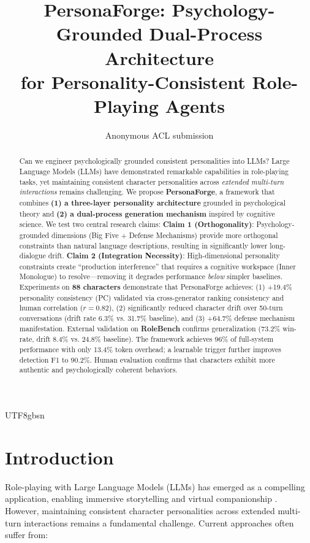 \documentclass[11pt]{article}
\title{PersonaForge: Psychology-Grounded Dual-Process Architecture \\ for Personality-Consistent Role-Playing Agents}
\author{Anonymous ACL submission}
\begin{document}
\begin{CJK*}{UTF8}{gbsn}
\maketitle

\begin{abstract}
Can we engineer psychologically grounded consistent personalities into LLMs? Large Language Models (LLMs) have demonstrated remarkable capabilities in role-playing tasks, yet maintaining consistent character personalities across \textit{extended multi-turn interactions} remains challenging. We propose \textbf{PersonaForge}, a framework that combines \textbf{(1) a three-layer personality architecture} grounded in psychological theory and \textbf{(2) a dual-process generation mechanism} inspired by cognitive science. We test two central research claims: \textbf{Claim 1 (Orthogonality)}: Psychology-grounded dimensions (Big Five + Defense Mechanisms) provide more orthogonal constraints than natural language descriptions, resulting in significantly lower long-dialogue drift. \textbf{Claim 2 (Integration Necessity)}: High-dimensional personality constraints create ``production interference'' that requires a cognitive workspace (Inner Monologue) to resolve---removing it degrades performance \textit{below} simpler baselines. Experiments on \textbf{88 characters} demonstrate that PersonaForge achieves: (1) +19.4\% personality consistency (PC) validated via cross-generator ranking consistency and human correlation ($r=0.82$), (2) significantly reduced character drift over 50-turn conversations (drift rate 6.3\% vs. 31.7\% baseline), and (3) +64.7\% defense mechanism manifestation. External validation on \textbf{RoleBench} confirms generalization (73.2\% win-rate, drift 8.4\% vs. 24.8\% baseline). The framework achieves 96\% of full-system performance with only 13.4\% token overhead; a learnable trigger further improves detection F1 to 90.2\%. Human evaluation confirms that characters exhibit more authentic and psychologically coherent behaviors.
\end{abstract}

\section{Introduction}

Role-playing with Large Language Models (LLMs) has emerged as a compelling application, enabling immersive storytelling and virtual companionship \citep{chen2024persona}. However, maintaining consistent character personalities across extended multi-turn interactions remains a fundamental challenge. Current approaches often suffer from:


\end{CJK*}
\end{document}
